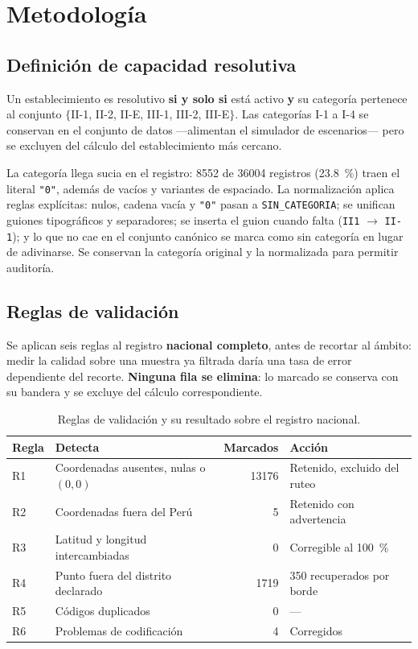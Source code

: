 \documentclass[11pt,a4paper]{article}
\begin{document}
\section{Metodología}
\label{sec:metodo}

\subsection{Definición de capacidad resolutiva}

Un establecimiento es resolutivo \textbf{si y solo si} está activo \textbf{y} su categoría
pertenece al conjunto $\{$II-1, II-2, II-E, III-1, III-2, III-E$\}$. Las categorías I-1 a I-4
se conservan en el conjunto de datos —alimentan el simulador de escenarios— pero se excluyen
del cálculo del establecimiento más cercano.

La categoría llega sucia en el registro: \num{8552} de \num{36004} registros
(\SI{23.8}{\percent}) traen el literal \texttt{"0"}, además de vacíos y variantes de
espaciado. La normalización aplica reglas explícitas: nulos, cadena vacía y \texttt{"0"} pasan
a \texttt{SIN\_CATEGORIA}; se unifican guiones tipográficos y separadores; se inserta el guion
cuando falta (\texttt{II1} $\rightarrow$ \texttt{II-1}); y lo que no cae en el conjunto
canónico se marca como sin categoría en lugar de adivinarse. Se conservan la categoría
original y la normalizada para permitir auditoría.

\subsection{Reglas de validación}

Se aplican seis reglas al registro \textbf{nacional completo}, antes de recortar al ámbito:
medir la calidad sobre una muestra ya filtrada daría una tasa de error dependiente del
recorte. \textbf{Ninguna fila se elimina}: lo marcado se conserva con su bandera y se excluye
del cálculo correspondiente.

\begin{table}[H]
\centering
\caption{Reglas de validación y su resultado sobre el registro nacional.}
\label{tab:reglas}
\small
\begin{tabular}{llrl}
\toprule
\textbf{Regla} & \textbf{Detecta} & \textbf{Marcados} & \textbf{Acción} \\
\midrule
R1 & Coordenadas ausentes, nulas o $(0,0)$ & \num{13176} & Retenido, excluido del ruteo \\
R2 & Coordenadas fuera del Perú & \num{5} & Retenido con advertencia \\
R3 & Latitud y longitud intercambiadas & \num{0} & Corregible al \SI{100}{\percent} \\
R4 & Punto fuera del distrito declarado & \num{1719} & \num{350} recuperados por borde \\
R5 & Códigos duplicados & \num{0} & --- \\
R6 & Problemas de codificación & \num{4} & Corregidos \\
\bottomrule
\end{tabular}
\end{table}
\end{document}
